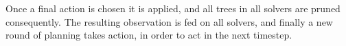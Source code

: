 Once a final action is chosen it is applied, and all trees in all solvers are pruned consequently.
The resulting observation is fed on all solvers, and finally a new round of planning takes action,
in order to act in the next timestep.

%
%
%
